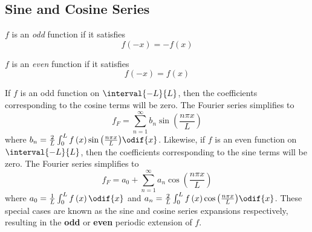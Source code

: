 \documentclass{article}
\begin{document}
\subsection{Sine and Cosine Series}
\begin{definition}
    \(f\) is an \textit{odd} function if it satisfies
    \begin{equation*}
        f\left( -x \right) = -f\left( x \right)
    \end{equation*}
\end{definition}
\begin{definition}
    \(f\) is an \textit{even} function if it satisfies
    \begin{equation*}
        f\left( -x \right) = f\left( x \right)
    \end{equation*}
\end{definition}
If \(f\) is an odd function on \(\interval{-L}{L}\), then the coefficients corresponding to the cosine terms will be zero.
The Fourier series simplifies to
\begin{equation*}
    f_F = \sum_{n = 1}^\infty b_n \sin{\left( \frac{n \pi x}{L} \right)}
\end{equation*}
where \(b_n = \frac{2}{L} \int_0^L f\left( x \right) \sin{\left( \frac{n \pi x}{L} \right)} \odif{x}\).
Likewise, if \(f\) is an even function on \(\interval{-L}{L}\), then the coefficients corresponding to the sine terms will be zero.
The Fourier series simplifies to
\begin{equation*}
    f_F = a_0 + \sum_{n = 1}^\infty a_n \cos{\left( \frac{n \pi x}{L} \right)}
\end{equation*}
where \(a_0 = \frac{1}{L} \int_0^L f\left( x \right) \odif{x}\) and \(a_n = \frac{2}{L} \int_0^L f\left( x \right) \cos{\left( \frac{n \pi x}{L} \right)} \odif{x}\).
These special cases are known as the sine and cosine series expansions respectively, resulting in the \textbf{odd} or \textbf{even} periodic extension of \(f\).
\end{document}
